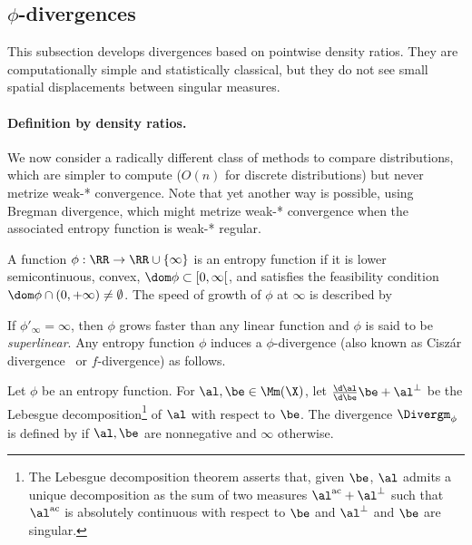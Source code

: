 \subsection[phi-divergences]{$\phi$-divergences}
\label{sec-phi-div}


This subsection develops divergences based on pointwise density ratios. They are computationally simple and statistically classical, but they do not see small spatial displacements between singular measures.

\paragraph{Definition by density ratios.}

We now consider a radically different class of methods to compare distributions, which are simpler to compute ($O(n)$ for discrete distributions) but never metrize weak-* convergence.
%
Note that yet another way is possible, using Bregman divergence, which might metrize weak-* convergence when the associated entropy function is weak-* regular.

\begin{defn}
\label{def_entropy}
A function $\phi : \RR \to \RR \cup \{\infty\}$ is an entropy function if it is lower semicontinuous, convex, $\dom \phi\subset [0,\infty[$, and satisfies the feasibility condition $\dom \phi \cap (0,+\infty) \neq \emptyset$. The speed of growth of $\phi$ at $\infty$ is described by %
\end{defn}

If $\phi'_\infty = \infty$, then $\phi$ grows faster than any linear function and $\phi$ is said to be \emph{superlinear}. Any entropy function $\phi$ induces a $\phi$-divergence (also known as Cisz\'ar divergence~\cite{ciszar1967information,ali1966general} or $f$-divergence) as follows.

\begin{defn}
\label{def_divergence}
Let $\phi$ be an entropy function.
For $\al,\be \in \Mm(\X)$, let $\frac{\d \al}{\d \be} \be + \al^{\perp}$ be the Lebesgue decomposition\footnote{The Lebesgue decomposition theorem asserts that, given $\be$, $\al$ admits a unique decomposition as the sum of two measures $\al^{\mathrm{ac}} + \al^\perp$ such that $\al^{\mathrm{ac}}$ is absolutely continuous with respect to $\be$ and $\al^\perp$ and $\be$ are singular.} of $\al$ with respect to $\be$. The divergence $\Divergm_\phi$ is defined by
if $\al,\be$ are nonnegative and $\infty$ otherwise.
\end{defn}%

